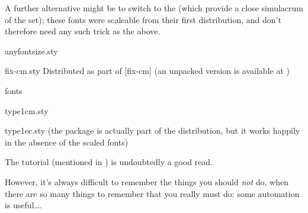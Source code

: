 A further alternative might be to switch to the
 (which
provide a close simulacrum of the 
 set); these fonts were scaleable from their first
distribution, and don't therefore need any such trick as the above.
\begin{ctanrefs}
\item[anyfontsize.sty]
\item[fix-cm.sty]Distributed as part of [fix-cm] (an unpacked
  version is available at )
\item[\nothtml{\rmfamily}\FontName{Latin} \FontName{Modern} fonts]
\item[type1cm.sty]
\item[type1ec.sty] (the package is actually part of
  the  distribution, but it works happily in
  the absence of the scaled fonts)
\end{ctanrefs}


The  tutorial (mentioned in %
) is undoubtedly a
good read.

However, it's always difficult to remember the things you should
\emph{not} do, when there are so many things to remember that you
really must do: some automation is useful\dots{}.

